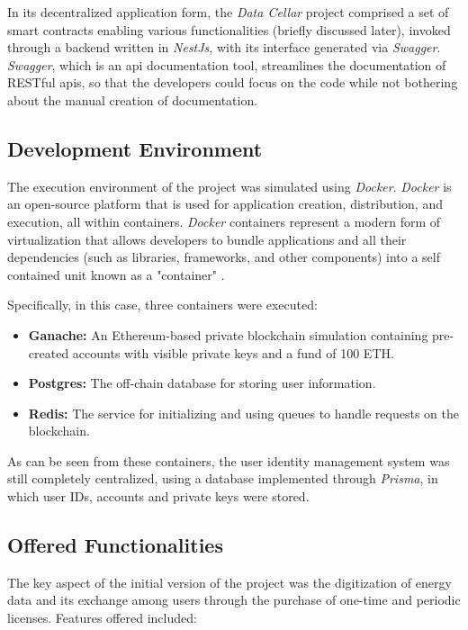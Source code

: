 In its decentralized application form, the \textit{Data Cellar} project comprised a set of smart contracts enabling various functionalities (briefly discussed later), invoked through
a backend written in \textit{NestJs}, with its interface generated via \textit{Swagger}. \textit{Swagger}, which is an \gls{api} documentation tool, streamlines the documentation of RESTful \gls{api}s, so that 
the developers could focus on the code while not bothering about the manual creation of documentation.

\subsection{Development Environment}

The execution environment of the project was simulated using \textit{Docker}. \textit{Docker} is an open-source platform that is used for application creation, distribution, and execution, 
all within containers. \textit{Docker} containers represent a modern form of virtualization that allows developers to bundle applications and all their dependencies (such as 
libraries, frameworks, and other components) into a self contained unit known as a "container" \cite{docker}.

Specifically, in this case, three containers were executed: 

\begin{itemize}
  \item \textbf{Ganache:} An Ethereum-based private blockchain simulation containing pre-created accounts with visible private keys and a fund of 100 ETH.
  \item \textbf{Postgres:} The off-chain database for storing user information.
  \item \textbf{Redis:} The service for initializing and using queues to handle requests on the blockchain.
\end{itemize}

As can be seen from these containers, the user identity management system was still completely centralized, using a database implemented through \textit{Prisma}, in which user IDs, 
accounts and private keys were stored.

\subsection{Offered Functionalities} 

The key aspect of the initial version of the project was the digitization of energy data and its exchange among users through the purchase of one-time and periodic licenses.
Features offered included:

